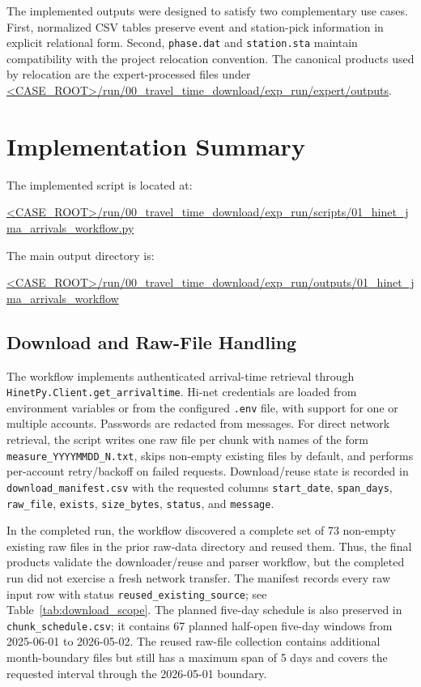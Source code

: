 \documentclass[11pt]{article}
\begin{document}
The implemented outputs were designed to satisfy two complementary use cases.  First, normalized CSV tables preserve event and station-pick information in explicit relational form.  Second, \texttt{phase.dat} and \texttt{station.sta} maintain compatibility with the project relocation convention.  The canonical products used by relocation are the expert-processed files under \url{<CASE_ROOT>/run/00_travel_time_download/exp_run/expert/outputs}.

\section{Implementation Summary}

The implemented script is located at:
\begin{center}
\small\url{<CASE_ROOT>/run/00_travel_time_download/exp_run/scripts/01_hinet_jma_arrivals_workflow.py}
\end{center}
The main output directory is:
\begin{center}
\small\url{<CASE_ROOT>/run/00_travel_time_download/exp_run/outputs/01_hinet_jma_arrivals_workflow}
\end{center}

\subsection{Download and Raw-File Handling}

The workflow implements authenticated arrival-time retrieval through \texttt{HinetPy.Client.get\_arrivaltime}.  Hi-net credentials are loaded from environment variables or from the configured \texttt{.env} file, with support for one or multiple accounts.  Passwords are redacted from messages.  For direct network retrieval, the script writes one raw file per chunk with names of the form \texttt{measure\_YYYYMMDD\_N.txt}, skips non-empty existing files by default, and performs per-account retry/backoff on failed requests.  Download/reuse state is recorded in \texttt{download\_manifest.csv} with the requested columns \texttt{start\_date}, \texttt{span\_days}, \texttt{raw\_file}, \texttt{exists}, \texttt{size\_bytes}, \texttt{status}, and \texttt{message}.

In the completed run, the workflow discovered a complete set of 73 non-empty existing raw files in the prior raw-data directory and reused them.  Thus, the final products validate the downloader/reuse and parser workflow, but the completed run did not exercise a fresh network transfer.  The manifest records every raw input row with status \texttt{reused\_existing\_source}; see Table~\ref{tab:download_scope}.  The planned five-day schedule is also preserved in \texttt{chunk\_schedule.csv}; it contains 67 planned half-open five-day windows from 2025-06-01 to 2026-05-02.  The reused raw-file collection contains additional month-boundary files but still has a maximum span of 5 days and covers the requested interval through the 2026-05-01 boundary.
\end{document}
